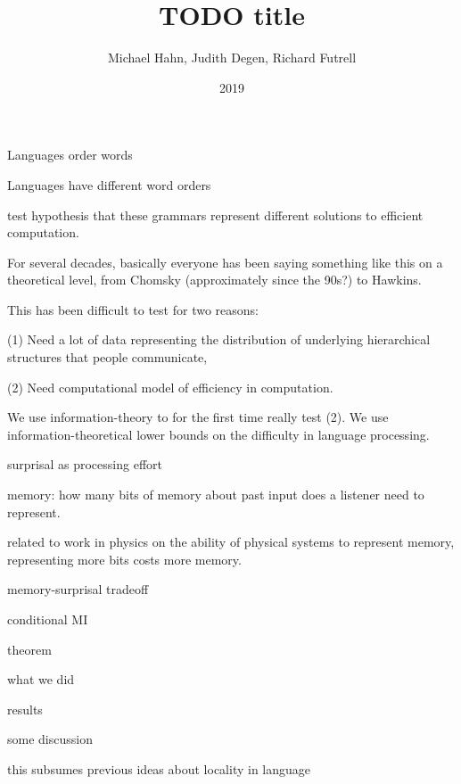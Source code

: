 \documentclass[11pt,letterpaper]{article}
\title{TODO title}
\author{Michael Hahn, Judith Degen, Richard Futrell}
\date{2019}
\newcounter{theorem}
\begin{document}
\maketitle

Languages order words

Languages have different word orders

test hypothesis that these grammars represent different solutions to efficient computation.

For several decades, basically everyone has been saying something like this on a theoretical level, from Chomsky (approximately since the 90s?) to Hawkins.

This has been difficult to test for two reasons:

(1) Need a lot of data representing the distribution of underlying hierarchical structures that people communicate,

(2) Need computational model of efficiency in computation.

We use information-theory to for the first time really test (2).
We use information-theoretical lower bounds on the difficulty in language processing.

surprisal as processing effort

memory: how many bits of memory about past input does a listener need to represent.

related to work in physics on the ability of physical systems to represent memory, representing more bits costs more memory.

memory-surprisal tradeoff

conditional MI

theorem

what we did

results

some discussion

this subsumes previous ideas about locality in language
\end{document}
